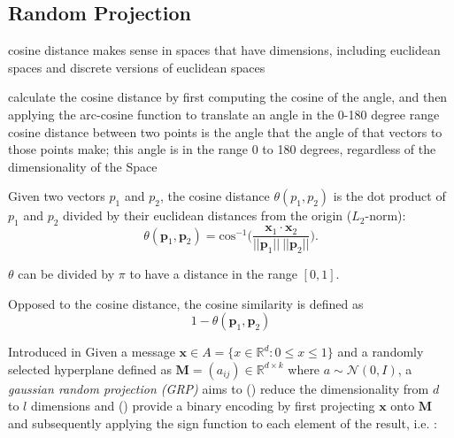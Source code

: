 \subsection{Random Projection}\label{subsec:random_projection}


cosine distance makes sense in spaces that have dimensions, including euclidean spaces and discrete versions of euclidean spaces \cite[95]{leskovec_rajaraman_ullman_2014}

calculate the cosine distance by first computing the cosine of the angle, and then applying the arc-cosine function to translate an angle in the 0-180 degree range \cite[95]{leskovec_rajaraman_ullman_2014}
cosine distance between two points is the angle that the angle of that vectors to those points make; this angle is in the range 0 to 180 degrees, regardless of the dimensionality of the Space

\begin{definition}
    Given two vectors $p_1$ and $p_2$, the cosine distance $\theta(p_1, p_2)$ is the dot product of $p_1$ and $p_2$ divided by their euclidean distances from the origin ($L_2$-norm):
    \begin{equation}
        \theta(\bm{p}_1, \bm{p}_2) = \text{cos}^{-1} \bigg( \frac{\bm{x}_1 \cdot \bm{x}_2}{||\bm{p}_1|| \: ||\bm{p}_2||} \Bigg).
    \end{equation}
\end{definition}

$\theta$ can be divided by $\pi$ to have a distance in the range $[0,1]$.

\begin{definition}
    Opposed to the cosine distance, the cosine similarity is defined as
    \begin{equation}
        1- \theta(\bm{p}_1, \bm{p}_2)
    \end{equation}
\end{definition}



Introduced in \cite{charikar2002similarity}
Given a message $\bm{x} \in A = \{x \in \mathbb{R}^d : 0 \leq x \leq 1 \}$ and a randomly selected hyperplane defined as $\bm{M}=(a_{ij}) \in \mathbb{R}^{d \times k}$ where $a \sim \mathcal{N}(0, I)$, a \textit{gaussian random projection (GRP)} aims to () reduce the dimensionality from $d$ to $l$ dimensions and () provide a binary encoding by first projecting $\bm{x}$ onto $\bm{M}$ and subsequently applying the sign function to each element of the result, i.e. :

